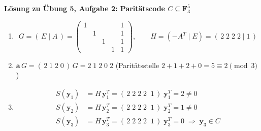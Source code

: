 \textbf{Lösung zu Übung 5, Aufgabe 2: Paritätscode $C \subseteq \mathbf{F}_3^5$}

\begin{loesung}
\begin{enumerate}[label=\alph*)]
\item
\[
G = (\,E \mid A\,) =
\begin{pmatrix}
1 & & & & 1\\
& 1 & & & 1\\
& & 1 & & 1\\
& & & 1 & 1
\end{pmatrix}, \qquad
H = (-A^T \mid E) = (\,2\;2\;2\;2 \mid 1\,)
\]
\item $\mathbf{a}\,G = (\,2\;1\;2\;0\,)\,G = 2\;1\;2\;0\;2$ \quad (Paritätsstelle $2+1+2+0 = 5 \equiv 2 \pmod{3}$)
\item
\begin{align*}
S(\mathbf{y}_1) &= H\,\mathbf{y}_1^T = (\,2\;2\;2\;2\;\;1\,)\;\mathbf{y}_1^T = 2 \ne 0\\
S(\mathbf{y}_2) &= H\,\mathbf{y}_2^T = (\,2\;2\;2\;2\;\;1\,)\;\mathbf{y}_2^T = 1 \ne 0\\
S(\mathbf{y}_3) &= H\,\mathbf{y}_3^T = (\,2\;2\;2\;2\;\;1\,)\;\mathbf{y}_3^T = 0 \;\Rightarrow\; \mathbf{y}_3 \in C
\end{align*}
\end{enumerate}
\end{loesung}

